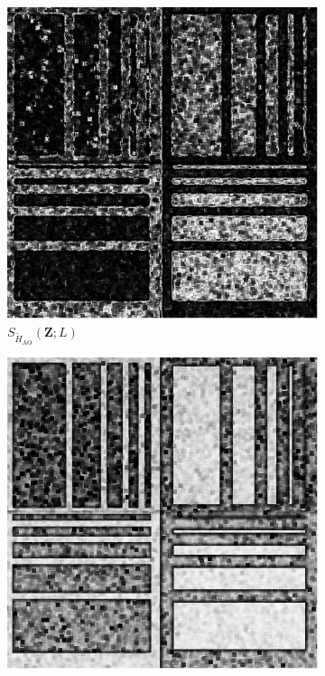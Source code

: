 \begin{figure}[H]
  \centering
  \begin{subfigure}[b]{0.3\textwidth}
    \centering
    \includegraphics[width=\textwidth]{../../Figures/PNG/H_pvalue_Phantom_4_z1_200b}
    \caption{$S_{\widetilde{H}_{\text{AO}}}(\bm{Z}; L)$}
    \label{fig:sim_SAR_Images-1}
  \end{subfigure}
  \hfill
  \begin{subfigure}[b]{0.3\textwidth}
    \centering
    \includegraphics[width=\textwidth]{../../Figures/PNG/cv_pvalues_Phantom_4_z1}

\end{subfigure}
\end{figure}
